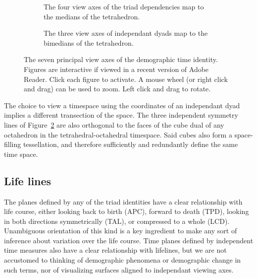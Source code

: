\begin{figure}
\begin{subfigure}{.48\textwidth}

\caption{The four view axes of the triad dependencies map to the medians of the
tetrahedron.}
\label{fig:depviewaxes}
\end{subfigure}
\begin{subfigure}{.48\textwidth}

\caption{The three view axes of independant dyads map to the bimedians of the
tetrahedron.}
\label{fig:indepviewaxes}
\end{subfigure}
\caption{The seven principal view axes of the demographic time identity.
Figures are interactive if viewed in a recent version of Adobe Reader. Click
each figure to activate. A mouse wheel (or right click and drag) can be used to
zoom. Left click and drag to rotate.}
\label{fig:viewaxes}
\end{figure}

The choice to view a timespace using the coordinates of an independant dyad implies a different transection of the space. The three independent symmetry lines of Figure~\ref{fig:indepviewaxes} are also orthogonal to the faces of the cube dual of any octahedron in the
tetrahedral-octahedral timespace. Said cubes also form a space-filling tessellation, and therefore sufficiently and redundantly define the same time space.

\subsection{Life lines}
The planes defined by any of the triad identities have a clear relationship with life course, either looking back to birth (APC), forward to death (TPD), looking in both directions symmetrically (TAL), or compressed to a whole (LCD). Unambiguous orientation of this kind is a key ingredient to make any sort of inference about variation over the life course. Time planes defined by independent time measures also have a clear relationship with lifelines, but we are not accustomed to thinking of demographic phenomena or demographic change in such terms, nor of visualizing surfaces aligned to independant viewing axes.

